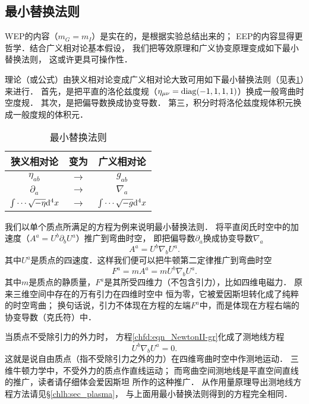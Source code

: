 \subsection{最小替换法则}\label{chfd:sec_sr2gr}
WEP的内容（$m_G=m_I$）是实在的，是根据实验总结出来的；
EEP的内容显得更哲学．结合广义相对论基本假设，
我们把等效原理和广义协变原理变成如下最小替换法则\cite[\S 16.2]{mtw1973}，
这或许更具可操作性．

理论（或公式）由狭义相对论变成广义相对论大致可用如下{\heiti 最小替换法则}（见表\ref{chfd:tab-sr2gr}）来进行．
首先，是把平直的洛伦兹度规（$\eta_{\mu\nu}={\rm diag}(-1,1,1,1)$）换成一般弯曲时空度规．
其次，是把偏导数换成协变导数．
第三，积分时将洛伦兹度规体积元换成一般度规的体积元．
\begin{table}[htb]
    \centering
    \caption{最小替换法则} \label{chfd:tab-sr2gr}
    \begin{tabular}{|*3{c|}}
        \hline
        狭义相对论 & 变为 & 广义相对论 \\ \hline
        $\eta_{ab}$ & $\to$ & $g_{ab}$   \\ \hline
        $\partial_{a}$ & $\to$ & $\nabla_{a}$   \\ \hline
        $\int\cdots\sqrt{-\eta}{\rm d}^4x$ & $\to$ & $\int\cdots \sqrt{-g}{\rm d}^4x$   \\ \hline
    \end{tabular}
\end{table}

我们以单个质点所满足的方程为例来说明最小替换法则．
将平直闵氏时空中的加速度（$A^a = U^b \partial_b U^a$）推广到弯曲时空，
即把偏导数$\partial_a$换成协变导数$\nabla_a$
\begin{equation}
    A^a = U^b \nabla_b U^a .
\end{equation}
其中$U^a$是质点的四速度．这样我们便可以把牛顿第二定律推广到弯曲时空
\begin{equation}\label{chfd:eqn_NewtonII-gr}
    F^a = m A^a = m U^b \nabla_b U^a .
\end{equation}
其中$m$是质点的静质量，$F^a$是其所受四维力（不包含引力），比如四维电磁力．
{\kaishu 原来三维空间中存在的万有引力在四维时空中
    {\heiti 恒为零}，它被爱因斯坦转化成了纯粹的时空弯曲；
    换句话说，引力不体现在方程的左端$F^a$中，而是体现在方程右端的协变导数（克氏符）中．}

当质点不受除引力的外力时，
方程\eqref{chfd:eqn_NewtonII-gr}化成了测地线方程
\begin{equation}\label{chfd:eqn_geodesic-gr}
    U^b \nabla_b U^a =0.
\end{equation}
这就是说自由质点（指不受除引力之外的力）在四维弯曲时空中作测地运动．
三维牛顿力学中，不受外力的质点作直线运动；
而弯曲空间测地线是平直空间直线的推广，读者请仔细体会爱因斯坦
所作的这种推广．
从作用量原理导出测地线方程方法请见\S \ref{chlh:sec_plasma}，
与上面用最小替换法则得到的方程完全相同．





